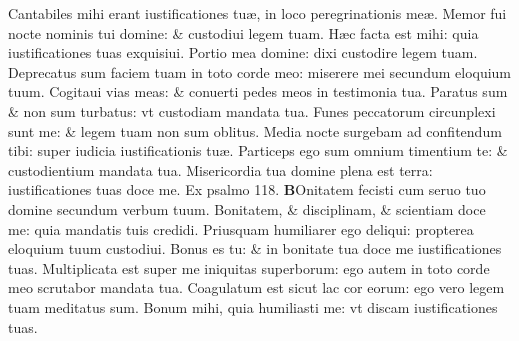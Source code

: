 \documentclass[a5paper,10pt]{book}
\def\ae{æ}
\begin{document}
\begin{multicols*}{2}
\newline \color{red} C\color{black}antabiles mihi erant iustificationes tu\ae , in loco peregrinationis me\ae .
\newline \color{red} M\color{black}emor fui nocte nominis tui domine: \& custodiui legem tuam.
\newline \color{red} H\color{black}\ae c facta est mihi: quia iustificationes tuas exquisiui.
\newline \color{red} P\color{black}ortio mea domine: dixi custodire legem tuam.
\newline \color{red} D\color{black}eprecatus sum faciem tuam in toto corde meo: miserere mei secundum eloquium tuum.
\newline \color{red} C\color{black}ogitaui vias meas: \& conuerti pedes meos in testimonia tua.
\newline \color{red} P\color{black}aratus sum \& non sum turbatus: vt custodiam mandata tua.
\newline \color{red} F\color{black}unes peccatorum circunplexi sunt me: \& legem tuam non sum oblitus.
\newline \color{red} M\color{black}edia nocte surgebam ad confitendum tibi: super iudicia iustificationis tu\ae .
\newline \color{red} P\color{black}articeps ego sum omnium timentium te: \& custodientium mandata tua.
\newline \color{red} M\color{black}isericordia tua domine plena est terra: iustificationes tuas doce me. \quad \color{red} Ex psalmo \hypertarget{ps118.5}{118.} \color{black}
\vspace{-1em}
\lettrine[lines=2]{\bfseries \color{red} B}{}Onitatem fecisti cum seruo tuo domine secundum verbum tuum.
\newline \color{red} B\color{black}onitatem, \& disciplinam, \& scientiam doce me: quia mandatis tuis credidi.
\newline \color{red} P\color{black}riusquam humiliarer ego deliqui: propterea eloquium tuum custodiui.
\newline \color{red} B\color{black}onus es tu: \& in bonitate tua doce me iustificationes tuas.
\newline \color{red} M\color{black}ultiplicata est super me iniquitas superborum: ego autem in toto corde meo scrutabor mandata tua.
\newline \color{red} C\color{black}oagulatum est sicut lac cor eorum: ego vero legem tuam meditatus sum.
\newline \color{red} B\color{black}onum mihi, quia humiliasti me: vt discam iustificationes tuas.

\end{multicols*}
\end{document}
